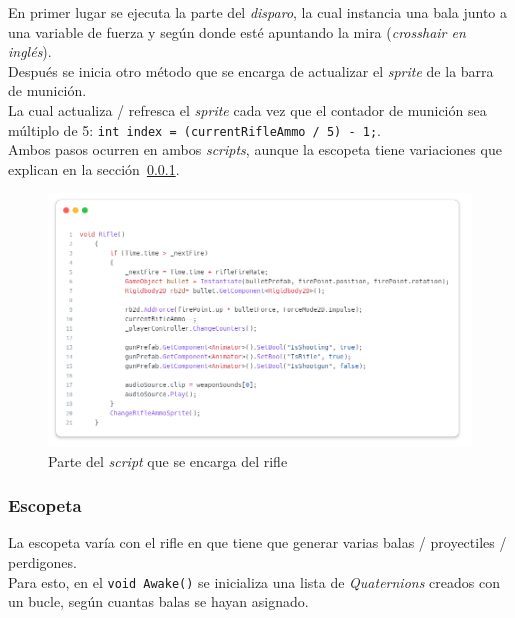 \documentclass[11pt]{article}
\begin{document}
            En primer lugar se ejecuta la parte del \textit{disparo}, la cual instancia una bala junto a una variable de fuerza y según donde esté apuntando la mira (\textit{crosshair en inglés}).\\

            Después se inicia otro método que se encarga de actualizar el \textit{sprite} de la barra de munición.\\ 
            La cual actualiza / refresca el \textit{sprite} cada vez que el contador de munición sea múltiplo de 5: \texttt{int index = (currentRifleAmmo / 5) - 1;}. \\

            Ambos pasos ocurren en ambos \textit{scripts}, aunque la escopeta tiene variaciones que explican en la sección~\ref{escopeta}.

            \begin{figure}[H]
                \centering
                \includegraphics[width=\textwidth]{Images/ShootyMacShooty/rilfe.png}
                \caption{Parte del \textit{script} que se encarga del rifle}
            \end{figure}
        \newpage
        \subsubsection{Escopeta} \label{escopeta}
            La escopeta varía con el rifle en que tiene que generar varias balas / proyectiles / perdigones.\\

            Para esto, en el \texttt{void Awake()} se inicializa una lista de \textit{Quaternions} creados con un bucle, según cuantas balas se hayan asignado.\\ 
\end{document}
